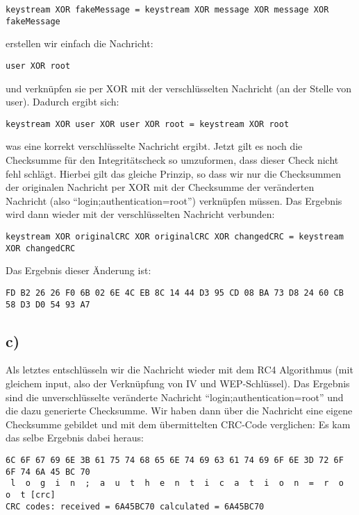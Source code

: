 \documentclass[10pt,a4paper]{article}
\begin{document}
\begin{verbatim}
keystream XOR fakeMessage = keystream XOR message XOR message XOR fakeMessage
\end{verbatim}

erstellen wir einfach die Nachricht:

\begin{verbatim}
user XOR root
\end{verbatim}

und verknüpfen sie per XOR mit der verschlüsselten Nachricht (an der Stelle von user).
Dadurch ergibt sich:

\begin{verbatim}
keystream XOR user XOR user XOR root = keystream XOR root
\end{verbatim}

was eine korrekt verschlüsselte Nachricht ergibt. Jetzt gilt es noch die Checksumme für den Integritätscheck so umzuformen, dass dieser Check nicht fehl schlägt. Hierbei gilt das gleiche Prinzip, so dass wir nur die Checksummen der originalen Nachricht per XOR mit der Checksumme der veränderten Nachricht (also "`login;authentication=root"') verknüpfen müssen. Das Ergebnis wird dann wieder mit der verschlüsselten Nachricht verbunden:

\begin{verbatim}
keystream XOR originalCRC XOR originalCRC XOR changedCRC = keystream XOR changedCRC
\end{verbatim}

Das Ergebnis dieser Änderung ist:

\begin{verbatim}
FD B2 26 26 F0 6B 02 6E 4C EB 8C 14 44 D3 95 CD 08 BA 73 D8 24 60 CB 58 D3 D0 54 93 A7
\end{verbatim}

\subsection*{c)}

Als letztes entschlüsseln wir die Nachricht wieder mit dem RC4 Algorithmus (mit gleichem input, also der Verknüpfung von IV und WEP-Schlüssel). Das Ergebnis sind die unverschlüsselte veränderte Nachricht "`login;authentication=root"' und die dazu generierte Checksumme. Wir haben dann über die Nachricht eine eigene Checksumme gebildet und mit dem übermittelten CRC-Code verglichen: Es kam das selbe Ergebnis dabei heraus:

\begin{verbatim}
6C 6F 67 69 6E 3B 61 75 74 68 65 6E 74 69 63 61 74 69 6F 6E 3D 72 6F 6F 74 6A 45 BC 70 
 l  o  g  i  n  ;  a  u  t  h  e  n  t  i  c  a  t  i  o  n  =  r  o  o  t [crc]
CRC codes: received = 6A45BC70 calculated = 6A45BC70
\end{verbatim}
\end{document}

